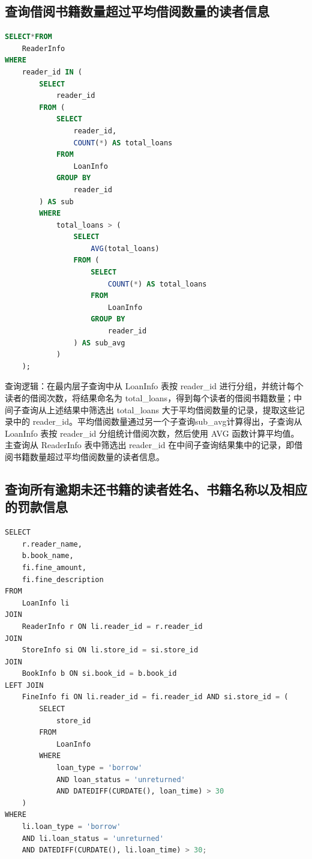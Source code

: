 \documentclass[a4paper,14pt]{article}
\begin{document}
\subsection{查询借阅书籍数量超过平均借阅数量的读者信息}
\begin{lstlisting}[language=sql, breaklines=true]
SELECT*FROM 
    ReaderInfo
WHERE 
    reader_id IN (
        SELECT 
            reader_id 
        FROM (
            SELECT 
                reader_id, 
                COUNT(*) AS total_loans
            FROM 
                LoanInfo
            GROUP BY 
                reader_id
        ) AS sub
        WHERE 
            total_loans > (
                SELECT 
                    AVG(total_loans)
                FROM (
                    SELECT 
                        COUNT(*) AS total_loans
                    FROM 
                        LoanInfo
                    GROUP BY 
                        reader_id
                ) AS sub_avg
            )
    );
\end{lstlisting}

查询逻辑：在最内层子查询中从 LoanInfo 表按 reader\_id 进行分组，并统计每个读者的借阅次数，将结果命名为 total\_loans，得到每个读者的借阅书籍数量；中间子查询从上述结果中筛选出 total\_loans 大于平均借阅数量的记录，提取这些记录中的 reader\_id。平均借阅数量通过另一个子查询sub\_avg计算得出，子查询从 LoanInfo 表按 reader\_id 分组统计借阅次数，然后使用 AVG 函数计算平均值。主查询从 ReaderInfo 表中筛选出 reader\_id 在中间子查询结果集中的记录，即借阅书籍数量超过平均借阅数量的读者信息。

\subsection{查询所有逾期未还书籍的读者姓名、书籍名称以及相应的罚款信息}
\begin{lstlisting}[language=python, breaklines=true]
SELECT 
    r.reader_name,
    b.book_name,
    fi.fine_amount,
    fi.fine_description
FROM 
    LoanInfo li
JOIN 
    ReaderInfo r ON li.reader_id = r.reader_id
JOIN 
    StoreInfo si ON li.store_id = si.store_id
JOIN 
    BookInfo b ON si.book_id = b.book_id
LEFT JOIN 
    FineInfo fi ON li.reader_id = fi.reader_id AND si.store_id = (
        SELECT 
            store_id 
        FROM 
            LoanInfo 
        WHERE 
            loan_type = 'borrow' 
            AND loan_status = 'unreturned' 
            AND DATEDIFF(CURDATE(), loan_time) > 30
    )
WHERE 
    li.loan_type = 'borrow' 
    AND li.loan_status = 'unreturned' 
    AND DATEDIFF(CURDATE(), li.loan_time) > 30;
\end{lstlisting}
\end{document}
